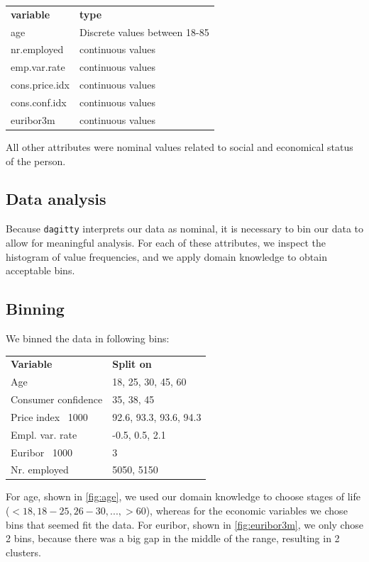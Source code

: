 \documentclass[11pt]{article}
\begin{document}
\begin{multicols}{2}
\medskip
\begin{tabular}{ll}
    \textbf{variable} & \textbf{type} \\
    age & Discrete values between 18-85 \\
    nr.employed & continuous values \\
    emp.var.rate & continuous values \\
    cons.price.idx & continuous values \\
    cons.conf.idx & continuous values \\
    euribor3m & continuous values \\
\end{tabular}

\medskip
\noindent All other attributes were nominal values related to social and economical status of the person.

\subsection{Data analysis}
Because \texttt{dagitty} interprets our data as nominal, it is necessary to bin
our data to allow for meaningful analysis. For each of these attributes, we
inspect the histogram of value frequencies, and we apply domain knowledge to obtain
acceptable bins.

\subsection{Binning}
We binned the data in following bins:

\medskip
\begin{tabular}{ll}
	\textbf{Variable}           & \textbf{Split on} \\
	Age                         & 18, 25, 30, 45, 60 \\
	Consumer confidence         & 35, 38, 45 \\
	Price index \ 1000          & 92.6, 93.3, 93.6, 94.3 \\
	Empl. var. rate             & -0.5, 0.5, 2.1 \\
	Euribor \ 1000              & 3 \\
	Nr. employed                & 5050, 5150 \\
\end{tabular}

\medskip
For age, shown in \autoref{fig:age}, we used our domain knowledge to choose stages of life ($<18, 18-25, 26-30, ..., >60$), whereas for the economic variables we chose bins that seemed fit the data. For euribor, shown in \autoref{fig:euribor3m}, we only chose 2 bins, because there was a big gap in the middle of the range, resulting in 2 clusters.


\end{multicols}
\end{document}
